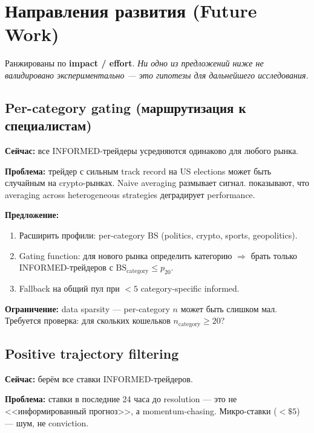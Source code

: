 \documentclass[a4paper, 11pt]{article}
\newcommand{\bs}{\mathrm{BS}}
\begin{document}
\section{Направления развития (Future Work)}
\label{sec:improvements}

Ранжированы по \textbf{impact / effort}.
\emph{Ни одно из предложений ниже не валидировано экспериментально ---
это гипотезы для дальнейшего исследования.}

\subsection{Per-category gating (маршрутизация к специалистам)}
\label{sec:gating}

\textbf{Сейчас:} все INFORMED-трейдеры усредняются одинаково для любого рынка.

\textbf{Проблема:} трейдер с сильным track record на US elections может быть
случайным на crypto-рынках. Naive averaging размывает сигнал.
\citet{dibm2025} показывают, что averaging across heterogeneous strategies
деградирует performance.

\textbf{Предложение:}
\begin{enumerate}[nosep]
  \item Расширить профили: per-category BS (politics, crypto, sports, geopolitics).
  \item Gating function: для нового рынка определить категорию $\Rightarrow$
    брать только INFORMED-трейдеров с $\bs_{\mathrm{category}} \leq p_{20}$.
  \item Fallback на общий пул при $<5$ category-specific informed.
\end{enumerate}

\textbf{Ограничение:} data sparsity --- per-category $n$ может быть слишком мал.
Требуется проверка: для скольких кошельков $n_{\mathrm{category}} \geq 20$?

\subsection{Positive trajectory filtering}

\textbf{Сейчас:} берём все ставки INFORMED-трейдеров.

\textbf{Проблема:} ставки в последние 24 часа до resolution ---
это не <<информированный прогноз>>, а momentum-chasing.
Микро-ставки ($< \$5$) --- шум, не conviction.
\end{document}
